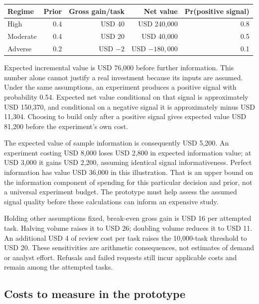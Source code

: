 \begin{center}
\begin{tabular}{@{}lrrrr@{}}
\toprule
Regime & Prior & Gross gain/task & Net value & Pr(positive signal) \\
\midrule
High & 0.4 & USD 40 & USD 240,000 & 0.8 \\
Moderate & 0.4 & USD 20 & USD 40,000 & 0.5 \\
Adverse & 0.2 & USD $-2$ & USD $-180,000$ & 0.1 \\
\bottomrule
\end{tabular}
\end{center}

Expected incremental value is USD 76,000 before further information.
This number alone cannot justify a real investment because its inputs
are assumed. Under the same assumptions, an experiment produces a
positive signal with probability 0.54. Expected net value conditional on
that signal is approximately USD 150,370, and conditional on a negative
signal it is approximately minus USD 11,304. Choosing to build only
after a positive signal gives expected value USD 81,200 before the
experiment's own cost.

The expected value of sample information is consequently USD 5,200. An
experiment costing USD 8,000 loses USD 2,800 in expected information
value; at USD 3,000 it gains USD 2,200, assuming identical signal
informativeness. Perfect information has value USD 36,000 in this
illustration. That is an upper bound on the information component of
spending for this particular decision and prior, not a universal
experiment budget. The prototype must help assess the assumed signal
quality before these calculations can inform an expensive study.
\citep{sp13_economics}

Holding other assumptions fixed, break-even gross gain is USD 16 per
attempted task. Halving volume raises it to USD 26; doubling volume
reduces it to USD 11. An additional USD 4 of review cost per task raises
the 10,000-task threshold to USD 20. These sensitivities are arithmetic
consequences, not estimates of demand or analyst effort. Refusals and
failed requests still incur applicable costs and remain among the
attempted tasks. \citep{sp13_economics_sensitivity}

\hypertarget{costs-to-measure-in-the-prototype}{%
\subsection{Costs to measure in the
prototype}\label{costs-to-measure-in-the-prototype}}

